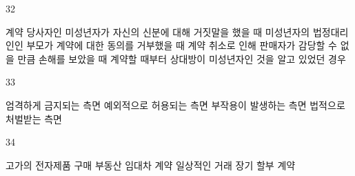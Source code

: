 \documentclass[fs9,seriesRus]{korfarm-base}
\begin{document}
\begin{kfSentenceUnit}{32}{}
\begin{kfChoices}
\kfChoice 계약 당사자인 미성년자가 자신의 신분에 대해 거짓말을 했을 때
\kfChoice 미성년자의 법정대리인인 부모가 계약에 대한 동의를 거부했을 때
\kfChoice 계약 취소로 인해 판매자가 감당할 수 없을 만큼 손해를 보았을 때
\kfChoice 계약할 때부터 상대방이 미성년자인 것을 알고 있었던 경우
\end{kfChoices}
\end{kfSentenceUnit}

\begin{kfSentenceUnit}{33}{}
\begin{kfChoices}
\kfChoice 엄격하게 금지되는 측면
\kfChoice 예외적으로 허용되는 측면
\kfChoice 부작용이 발생하는 측면
\kfChoice 법적으로 처벌받는 측면
\end{kfChoices}
\end{kfSentenceUnit}

\begin{kfSentenceUnit}{34}{}
\begin{kfChoices}
\kfChoice 고가의 전자제품 구매
\kfChoice 부동산 임대차 계약
\kfChoice 일상적인 거래
\kfChoice 장기 할부 계약
\end{kfChoices}
\end{kfSentenceUnit}

\kfEndMC

\kfActivityBg \par{}\par\nopagebreak[4]\smallskip\nopagebreak[4]
\begin{kfStructure}
\end{kfStructure}

\end{document}
